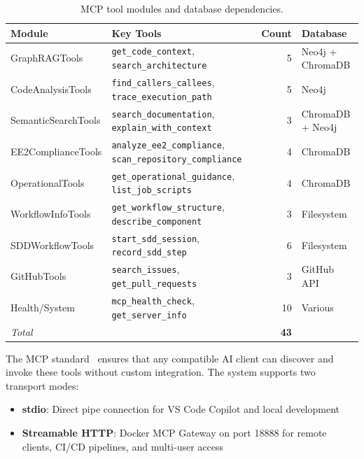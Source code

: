 \documentclass[11pt,letterpaper]{article}
\begin{document}
\begin{table}[H]
\centering
\caption{MCP tool modules and database dependencies.}
\label{tab:tools}
\small
\begin{tabular}{@{}llrl@{}}
\toprule
\textbf{Module} & \textbf{Key Tools} & \textbf{Count} & \textbf{Database} \\
\midrule
GraphRAGTools & \texttt{get\_code\_context},
    \texttt{search\_architecture} & 5 & Neo4j + ChromaDB \\
CodeAnalysisTools & \texttt{find\_callers\_callees},
    \texttt{trace\_execution\_path} & 5 & Neo4j \\
SemanticSearchTools & \texttt{search\_documentation},
    \texttt{explain\_with\_context} & 3 & ChromaDB + Neo4j \\
EE2ComplianceTools & \texttt{analyze\_ee2\_compliance},
    \texttt{scan\_repository\_compliance} & 4 & ChromaDB \\
OperationalTools & \texttt{get\_operational\_guidance},
    \texttt{list\_job\_scripts} & 4 & ChromaDB \\
WorkflowInfoTools & \texttt{get\_workflow\_structure},
    \texttt{describe\_component} & 3 & Filesystem \\
SDDWorkflowTools & \texttt{start\_sdd\_session},
    \texttt{record\_sdd\_step} & 6 & Filesystem \\
GitHubTools & \texttt{search\_issues},
    \texttt{get\_pull\_requests} & 3 & GitHub API \\
Health/System & \texttt{mcp\_health\_check},
    \texttt{get\_server\_info} & 10 & Various \\
\midrule
\textit{Total} & & \textbf{43} & \\
\bottomrule
\end{tabular}
\end{table}

The MCP standard~\cite{anthropic2024mcp} ensures that any compatible
AI client can discover and invoke these tools without custom integration.
The system supports two transport modes:

\begin{itemize}[nosep]
    \item \textbf{stdio}: Direct pipe connection for VS Code Copilot and
          local development
    \item \textbf{Streamable HTTP}: Docker MCP Gateway on port 18888 for
          remote clients, CI/CD pipelines, and multi-user access
\end{itemize}

\end{document}
